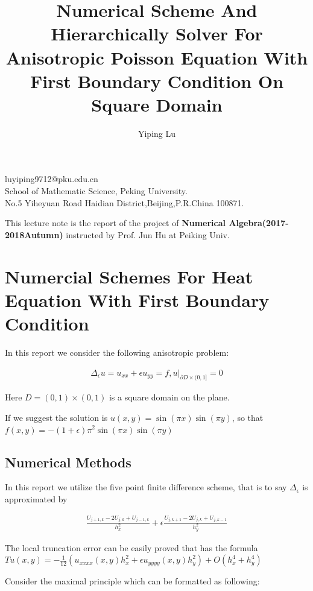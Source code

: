 \documentclass[12pt]{amsart}
\title{Numerical Scheme And Hierarchically Solver For Anisotropic Poisson Equation With First Boundary Condition On Square Domain}
\author{Yiping Lu}
\date{} %
\begin{document}
	
	

\maketitle
\begin{center}
	\small{luyiping9712@pku.edu.cn\\School of Mathematic Science, Peking University.\\No.5 Yiheyuan Road Haidian District,Beijing,P.R.China 100871.\\}
\end{center}

This lecture note is the report of the project of \textbf{Numerical Algebra(2017-2018Autumn)} instructed by Prof. Jun Hu at Peiking Univ.

\section{Numercial Schemes For Heat Equation With First Boundary Condition}

In this report we consider the following anisotropic problem:

\begin{align*}
\Delta_\epsilon u = u_{xx}+\epsilon u_{yy}=f,u|_{\partial D \times(0,1]}=0
\end{align*}

Here $D=(0,1)\times(0,1)$ is a square domain on the plane.

If we suggest the solution is $u(x,y)=\sin(\pi x)\sin(\pi y)$, so that$f(x,y)=-(1+\epsilon)\pi^2\sin(\pi x)\sin(\pi y)$


\subsection{Numerical Methods}


In this report we utilize the five point finite difference scheme, that is to say $\Delta_\epsilon$ is approximated by



\begin{align*}
\frac{U_{j+1,k}-2U_{j,k}+U_{j-1,k}}{h_x^2} + \epsilon \frac{U_{j,k+1}-2U_{j,k}+U_{j,k-1}}{h_y^2}
\end{align*}



 The local truncation error can be easily proved that has the formula $Tu(x,y)=-\frac{1}{12}(u_{xxxx}(x,y)h_x^2+\epsilon u_{yyyy}(x,y)h_y^2)+O(h_x^4+h_y^4)$

Consider the maximal principle which can be formatted as following:
\end{document}
